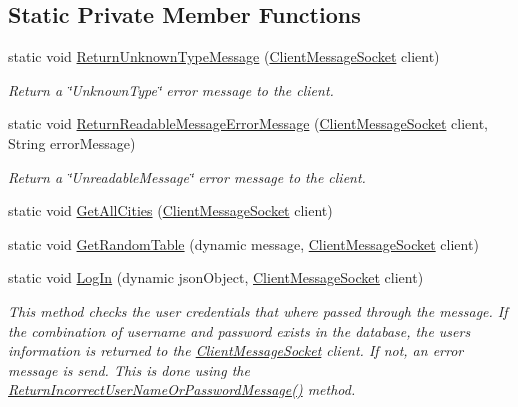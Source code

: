 \subsection*{Static Private Member Functions}
\begin{DoxyCompactItemize}
\item 
static void \hyperlink{class_e_l_i_server_1_1_messaging_1_1_message_handler_a760bf18782afa59dd63cf733ad7adb3a}{Return\+Unknown\+Type\+Message} (\hyperlink{class_e_l_i_server_1_1_messaging_1_1_client_message_socket}{Client\+Message\+Socket} client)
\begin{DoxyCompactList}\small\item\em Return a \char`\"{}\+Unknown\+Type\char`\"{} error message to the client. \end{DoxyCompactList}\item 
static void \hyperlink{class_e_l_i_server_1_1_messaging_1_1_message_handler_af295ba9c01e4e01a19edba696944cfae}{Return\+Readable\+Message\+Error\+Message} (\hyperlink{class_e_l_i_server_1_1_messaging_1_1_client_message_socket}{Client\+Message\+Socket} client, String error\+Message)
\begin{DoxyCompactList}\small\item\em Return a \char`\"{}\+Unreadable\+Message\char`\"{} error message to the client. \end{DoxyCompactList}\item 
static void \hyperlink{class_e_l_i_server_1_1_messaging_1_1_message_handler_a3dd06c4f9c959db12a96af3397114861}{Get\+All\+Cities} (\hyperlink{class_e_l_i_server_1_1_messaging_1_1_client_message_socket}{Client\+Message\+Socket} client)
\item 
static void \hyperlink{class_e_l_i_server_1_1_messaging_1_1_message_handler_a45ed426f6fdc21493aa8727d44a1b502}{Get\+Random\+Table} (dynamic message, \hyperlink{class_e_l_i_server_1_1_messaging_1_1_client_message_socket}{Client\+Message\+Socket} client)
\item 
static void \hyperlink{class_e_l_i_server_1_1_messaging_1_1_message_handler_ac7d3cf8905a2ddb6ff26f092c92fa886}{Log\+In} (dynamic json\+Object, \hyperlink{class_e_l_i_server_1_1_messaging_1_1_client_message_socket}{Client\+Message\+Socket} client)
\begin{DoxyCompactList}\small\item\em This method checks the user credentials that where passed through the message. If the combination of username and password exists in the database, the users information is returned to the \hyperlink{class_e_l_i_server_1_1_messaging_1_1_client_message_socket}{Client\+Message\+Socket} client. If not, an error message is send. This is done using the \hyperlink{class_e_l_i_server_1_1_messaging_1_1_message_handler_a9594cb08cdb01a3ae81e0e794447ff9c}{Return\+Incorrect\+User\+Name\+Or\+Password\+Message()} method. \end{DoxyCompactList}\item 

\end{DoxyCompactItemize}
